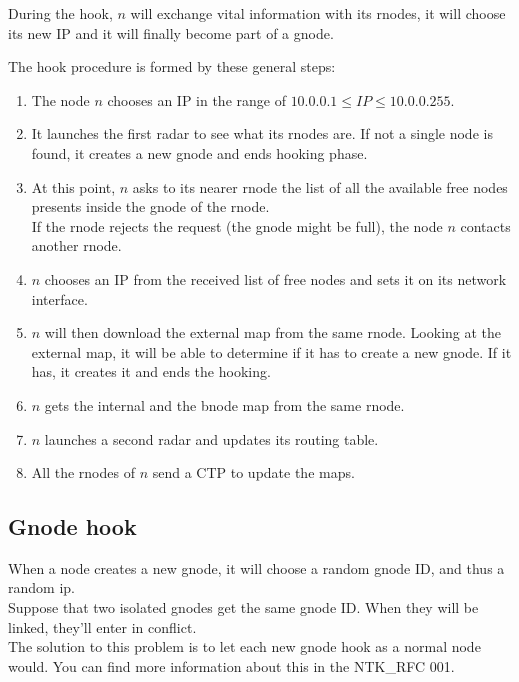 \documentclass[a4paper]{article}
\begin{document}
During the hook, $n$ will exchange vital information with its rnodes,
it will choose its new IP and it will finally become part of a gnode.

The hook procedure is formed by these general steps:
\begin{enumerate}
	\item The node $n$ chooses an IP in the range of $10.0.0.1 \le IP \le
		10.0.0.255$.
	\item It launches the first radar to see what its rnodes are. If not a
		single node is found, it creates a new gnode and ends hooking
		phase.
	\item At this point, $n$ asks to its nearer rnode the list of all the
		available free nodes presents inside the gnode of the rnode.\\
		If the rnode rejects the request (the gnode might be full),
		the node $n$ contacts another rnode.
	\item $n$ chooses an IP from the received list of free nodes and sets
		it on its network interface.
	\item $n$ will then download the external map from the same rnode.
		Looking at the external map, it will be able to determine if
		it has to create a new gnode. If it has, it creates it and
		ends the hooking.
	\item $n$ gets the internal and the bnode map from the same rnode.
	\item $n$ launches a second radar and updates its routing table.
	\item All the rnodes of $n$ send a CTP to update the maps.
\end{enumerate}


\subsection{Gnode hook}
When a node creates a new gnode, it will choose a random gnode ID, and thus
a random ip.\\
Suppose that two isolated gnodes get the same gnode ID. When they will be
linked, they'll enter in conflict.\\
The solution to this problem is to let each new gnode hook as a normal node
would. You can find more information about this in the NTK\_RFC 001\cite{gnodecontiguity}.


%

\end{document}
